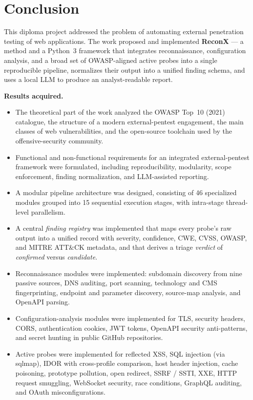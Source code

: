 \chapter{Conclusion}

This diploma project addressed the problem of automating external penetration testing of web applications. The work proposed and implemented \textbf{ReconX} --- a method and a Python~3 framework that integrates reconnaissance, configuration analysis, and a broad set of OWASP-aligned active probes into a single reproducible pipeline, normalizes their output into a unified finding schema, and uses a local LLM to produce an analyst-readable report.

\textbf{Results acquired.}
\begin{itemize}
  \item The theoretical part of the work analyzed the OWASP Top~10 (2021) catalogue, the structure of a modern external-pentest engagement, the main classes of web vulnerabilities, and the open-source toolchain used by the offensive-security community.
  \item Functional and non-functional requirements for an integrated external-pentest framework were formulated, including reproducibility, modularity, scope enforcement, finding normalization, and LLM-assisted reporting.
  \item A modular pipeline architecture was designed, consisting of 46 specialized modules grouped into 15 sequential execution stages, with intra-stage thread-level parallelism.
  \item A central \textit{finding registry} was implemented that maps every probe's raw output into a unified record with severity, confidence, CWE, CVSS, OWASP, and MITRE ATT\&CK metadata, and that derives a triage \textit{verdict} of \textit{confirmed} versus \textit{candidate}.
  \item Reconnaissance modules were implemented: subdomain discovery from nine passive sources, DNS auditing, port scanning, technology and CMS fingerprinting, endpoint and parameter discovery, source-map analysis, and OpenAPI parsing.
  \item Configuration-analysis modules were implemented for TLS, security headers, CORS, authentication cookies, JWT tokens, OpenAPI security anti-patterns, and secret hunting in public GitHub repositories.
  \item Active probes were implemented for reflected XSS, SQL injection (via sqlmap), IDOR with cross-profile comparison, host header injection, cache poisoning, prototype pollution, open redirect, SSRF / SSTI, XXE, HTTP request smuggling, WebSocket security, race conditions, GraphQL auditing, and OAuth misconfigurations.

\end{itemize}
